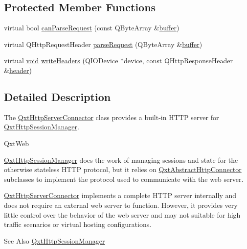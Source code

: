 \subsection*{Protected Member Functions}
\begin{DoxyCompactItemize}
\item 
virtual bool \hyperlink{class_qxt_http_server_connector_a42df6bfb46ed5db32b79d6dc29a3933b}{can\-Parse\-Request} (const Q\-Byte\-Array \&\hyperlink{glext_8h_af1b5122dc7bfe0a6319e14419cfe3423}{buffer})
\item 
virtual Q\-Http\-Request\-Header \hyperlink{class_qxt_http_server_connector_a442ecc3468b52152b8c71f16b1aa8b12}{parse\-Request} (Q\-Byte\-Array \&\hyperlink{glext_8h_af1b5122dc7bfe0a6319e14419cfe3423}{buffer})
\item 
virtual \hyperlink{group___u_a_v_objects_plugin_ga444cf2ff3f0ecbe028adce838d373f5c}{void} \hyperlink{class_qxt_http_server_connector_a25e30f64ea628f7ae4cef79844e1781b}{write\-Headers} (Q\-I\-O\-Device $\ast$device, const Q\-Http\-Response\-Header \&\hyperlink{crypt_8h_ae4f2f0852899a81dcd9b8a02e559f0f7}{header})
\end{DoxyCompactItemize}


\subsection{Detailed Description}
The \hyperlink{class_qxt_http_server_connector}{Qxt\-Http\-Server\-Connector} class provides a built-\/in H\-T\-T\-P server for \hyperlink{class_qxt_http_session_manager}{Qxt\-Http\-Session\-Manager}. 

Qxt\-Web

\hyperlink{class_qxt_http_session_manager}{Qxt\-Http\-Session\-Manager} does the work of managing sessions and state for the otherwise stateless H\-T\-T\-P protocol, but it relies on \hyperlink{class_qxt_abstract_http_connector}{Qxt\-Abstract\-Http\-Connector} subclasses to implement the protocol used to communicate with the web server.

\hyperlink{class_qxt_http_server_connector}{Qxt\-Http\-Server\-Connector} implements a complete H\-T\-T\-P server internally and does not require an external web server to function. However, it provides very little control over the behavior of the web server and may not suitable for high traffic scenarios or virtual hosting configurations.

\begin{DoxySeeAlso}{See Also}
\hyperlink{class_qxt_http_session_manager}{Qxt\-Http\-Session\-Manager} 
\end{DoxySeeAlso}


